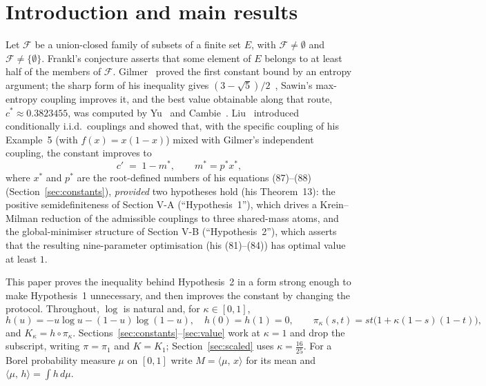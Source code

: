 \documentclass[11pt]{article}
\theoremstyle{plain}
\theoremstyle{definition}
\theoremstyle{remark}
\newcommand{\pr}[2]{\langle #1,\,#2\rangle}
\begin{document}
\section{Introduction and main results}\label{sec:intro}

Let $\mathcal F$ be a union-closed family of subsets of a finite set $E$,
with $\mathcal F\neq\emptyset$ and $\mathcal F\neq\{\emptyset\}$.  Frankl's
conjecture asserts that some element of $E$ belongs to at least half of the
members of $\mathcal F$.  Gilmer~\cite{Gil22} proved the first constant bound
by an entropy argument; the sharp form of his inequality gives
$(3-\sqrt5)/2$~\cite{CL22,AHS22,Saw22}, Sawin's max-entropy coupling improves
it, and the best value obtainable along that route, $c^\ast\approx0.3823455$,
was computed by Yu~\cite{Yu23} and Cambie~\cite{Cam22}.  Liu~\cite{Liu23}
introduced conditionally i.i.d.\ couplings and showed that, with the
specific coupling of his Example~5 (with $f(x)=x(1-x)$) mixed with Gilmer's
independent coupling, the constant improves to
\begin{equation}\label{eq:cprime}
  c' \;=\; 1-m^\ast, \qquad m^\ast=p^\ast x^\ast,
\end{equation}
where $x^\ast$ and $p^\ast$ are the root-defined numbers of his equations
(87)--(88) (Section~\ref{sec:constants}), \emph{provided} two hypotheses
hold (his Theorem~13): the positive semidefiniteness of Section V-A
(``Hypothesis~1''), which drives a Krein--Milman reduction of the admissible
couplings to three shared-mass atoms, and the global-minimiser structure of
Section V-B (``Hypothesis~2''), which asserts that the resulting
nine-parameter optimisation (his (81)--(84)) has optimal value at least $1$.

This paper proves the inequality behind Hypothesis~2 in a form strong enough
to make Hypothesis~1 unnecessary, and then improves the constant by changing
the protocol.  Throughout, $\log$ is natural and, for $\kappa\in[0,1]$,
\begin{equation}\label{eq:defs}
  h(u)=-u\log u-(1-u)\log(1-u),\quad h(0)=h(1)=0,\qquad
  \pi_\kappa(s,t)=st\bigl(1+\kappa(1-s)(1-t)\bigr),
\end{equation}
and $K_\kappa=h\circ\pi_\kappa$.
Sections~\ref{sec:constants}--\ref{sec:value} work at $\kappa=1$ and drop the
subscript, writing $\pi=\pi_1$ and $K=K_1$; Section~\ref{sec:scaled} uses
$\kappa=\tfrac{16}{25}$.  For a Borel probability measure $\mu$ on $[0,1]$
write $M=\pr{\mu}{x}$ for its mean and $\pr{\mu}{h}=\int h\,d\mu$.
\end{document}
